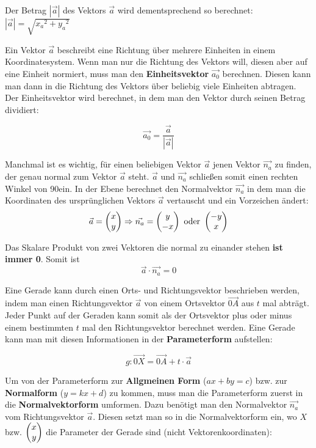Der Betrag $|\vec{a}|$ des Vektors $\vec{a}$ wird dementsprechend so berechnet: $ |\vec{a}| = \sqrt{{x_{a}}^2 + {y_{a}}^2}$


Ein Vektor $\vec{a}$ beschreibt eine Richtung \"{u}ber mehrere Einheiten in einem Koordinatesystem. Wenn man nur die Richtung des Vektors will, diesen aber auf eine Einheit normiert, muss man den \textbf{Einheitsvektor} $\vec{a_{0}}$ berechnen. Diesen kann man dann in die Richtung des Vektors \"{u}ber beliebig viele Einheiten abtragen. Der Einheitsvektor wird berechnet, in dem man den Vektor durch seinen Betrag dividiert:

$$\vec{a_{0}} = \frac{\vec{a}}{|\vec{a}|}$$


Manchmal ist es wichtig, f\"{u}r einen beliebigen Vektor $\vec{a}$ jenen Vektor $\vec{n_{a}}$ zu finden, der genau normal zum Vektor $\vec{a}$ steht. $\vec{a}$ und $\vec{n_{a}}$ schlie\ss{}en somit einen rechten Winkel von 90\degree ein. In der Ebene berechnet den Normalvektor $\vec{n_{a}}$ in dem man die Koordinaten des urspr\"{u}nglichen Vektors $\vec{a}$ vertauscht und ein Vorzeichen \"{a}ndert:
$$ \vec{a} = \begin{pmatrix}x\\y\end{pmatrix} \Rightarrow \vec{n_{a}} = \begin{pmatrix}y \\ -x\end{pmatrix} \text{ oder } \begin{pmatrix}-y \\ x\end{pmatrix}$$

Das Skalare Produkt von zwei Vektoren die normal zu einander stehen \textbf{ist immer 0}. Somit ist $$\vec{a} \cdot \vec{n_{a}} = 0$$

\pagebreak



Eine Gerade kann durch einen Orts- und Richtungsvektor beschrieben werden, indem man einen Richtungsvektor $\vec{a}$ von einem Ortsvektor $\vec{0A}$ aus $t$ mal abtr\"{a}gt. Jeder Punkt auf der Geraden kann somit als der Ortsvektor plus oder minus einem bestimmten $t$ mal den Richtungsvektor berechnet werden. Eine Gerade kann man mit diesen Informationen in der \textbf{Parameterform} aufstellen:

$$g: \vec{0X} = \vec{0A} + t \cdot \vec{a}$$


Um von der Parameterform zur \textbf{Allgmeinen Form} ($ax + by = c$) bzw. zur \textbf{Normalform} ($y = kx + d$) zu kommen, muss man die Parameterform zuerst in die \textbf{Normalvektorform} umformen. Dazu ben\"{o}tigt man den Normalvektor $\vec{n_{a}}$ vom Richtungsvektor $\vec{a}$. Diesen setzt man so in die Normalvektorform ein, wo $X$ bzw. $\begin{pmatrix}x\\y\end{pmatrix}$ die Parameter der Gerade sind (nicht Vektorenkoordinaten):

